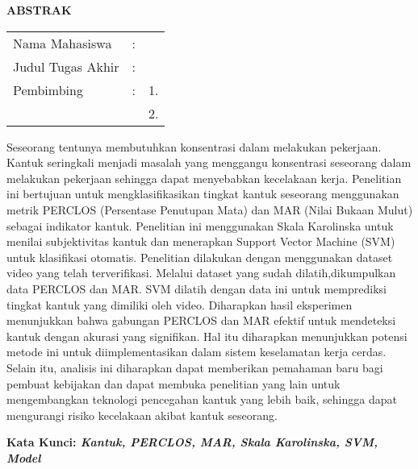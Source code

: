 \begin{center}
  \large\textbf{ABSTRAK}
\end{center}


\vspace{2ex}

\begingroup
\setlength{\tabcolsep}{0pt}

\noindent
\begin{tabularx}{\textwidth}{l >{\centering}m{2em} X}
  Nama Mahasiswa    & : & \name{}         \\

  Judul Tugas Akhir & : & \tatitle{}      \\

  Pembimbing        & : & 1. \advisor{}   \\
                    &   & 2. \coadvisor{} \\
\end{tabularx}
\endgroup

Seseorang tentunya membutuhkan konsentrasi dalam melakukan pekerjaan. Kantuk seringkali menjadi masalah yang menggangu konsentrasi seseorang dalam melakukan pekerjaan sehingga dapat menyebabkan kecelakaan kerja. Penelitian ini bertujuan untuk mengklasifikasikan tingkat kantuk seseorang menggunakan metrik PERCLOS (Persentase Penutupan Mata) dan MAR (Nilai Bukaan Mulut) sebagai indikator kantuk. Penelitian ini menggunakan Skala Karolinska untuk menilai subjektivitas kantuk dan menerapkan Support Vector Machine (SVM) untuk klasifikasi otomatis. Penelitian dilakukan dengan menggunakan dataset video yang telah terverifikasi. Melalui dataset yang sudah dilatih,dikumpulkan data PERCLOS dan MAR. SVM dilatih dengan data ini untuk memprediksi tingkat kantuk yang dimiliki oleh video. Diharapkan hasil eksperimen menunjukkan bahwa gabungan PERCLOS dan MAR efektif untuk mendeteksi kantuk dengan akurasi yang signifikan. Hal itu diharapkan menunjukkan potensi metode ini untuk diimplementasikan dalam sistem keselamatan kerja cerdas. Selain itu, analisis ini diharapkan dapat memberikan pemahaman baru bagi pembuat kebijakan dan dapat membuka penelitian yang lain untuk mengembangkan teknologi pencegahan kantuk yang lebih baik, sehingga dapat mengurangi risiko kecelakaan akibat kantuk seseorang.

\vspace{2ex}
\noindent
\textbf{Kata Kunci: \emph{Kantuk, PERCLOS, MAR, Skala Karolinska, SVM, Model}}